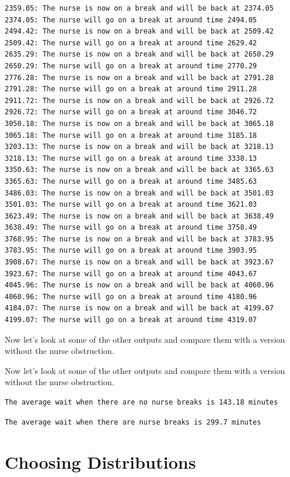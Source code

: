 \documentclass[
  letterpaper,
  DIV=11,
  numbers=noendperiod]{scrreprt}
\begin{document}
\begin{verbatim}
2359.05: The nurse is now on a break and will be back at 2374.05
2374.05: The nurse will go on a break at around time 2494.05
2494.42: The nurse is now on a break and will be back at 2509.42
2509.42: The nurse will go on a break at around time 2629.42
2635.29: The nurse is now on a break and will be back at 2650.29
2650.29: The nurse will go on a break at around time 2770.29
2776.28: The nurse is now on a break and will be back at 2791.28
2791.28: The nurse will go on a break at around time 2911.28
2911.72: The nurse is now on a break and will be back at 2926.72
2926.72: The nurse will go on a break at around time 3046.72
3050.18: The nurse is now on a break and will be back at 3065.18
3065.18: The nurse will go on a break at around time 3185.18
3203.13: The nurse is now on a break and will be back at 3218.13
3218.13: The nurse will go on a break at around time 3338.13
3350.63: The nurse is now on a break and will be back at 3365.63
3365.63: The nurse will go on a break at around time 3485.63
3486.03: The nurse is now on a break and will be back at 3501.03
3501.03: The nurse will go on a break at around time 3621.03
3623.49: The nurse is now on a break and will be back at 3638.49
3638.49: The nurse will go on a break at around time 3758.49
3768.95: The nurse is now on a break and will be back at 3783.95
3783.95: The nurse will go on a break at around time 3903.95
3908.67: The nurse is now on a break and will be back at 3923.67
3923.67: The nurse will go on a break at around time 4043.67
4045.96: The nurse is now on a break and will be back at 4060.96
4060.96: The nurse will go on a break at around time 4180.96
4184.07: The nurse is now on a break and will be back at 4199.07
4199.07: The nurse will go on a break at around time 4319.07
\end{verbatim}

Now let's look at some of the other outputs and compare them with a
version without the nurse obstruction.

Now let's look at some of the other outputs and compare them with a
version without the nurse obstruction.

\begin{verbatim}
The average wait when there are no nurse breaks is 143.18 minutes
\end{verbatim}

\begin{verbatim}
The average wait when there are nurse breaks is 299.7 minutes
\end{verbatim}

\chapter{Choosing Distributions}\label{sec-distributions}
\end{document}

